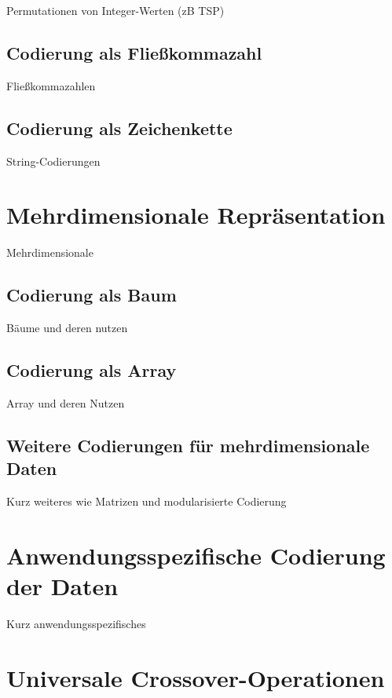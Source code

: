 \documentclass{llncs}
\begin{document}
Permutationen von Integer-Werten (zB TSP)

\subsection{Codierung als Fließkommazahl}
\label{sec:FloatCod}

Fließkommazahlen

\subsection{Codierung als Zeichenkette}
\label{sec:StrCod}

String-Codierungen

\section{Mehrdimensionale Repräsentation}
\label{sec:MehrdimRep}

Mehrdimensionale

\subsection{Codierung als Baum}
\label{sec:BaumCod}

Bäume und deren nutzen

\subsection{Codierung als Array}
\label{sec:ArrayCod}

Array und deren Nutzen

\subsection{Weitere Codierungen für mehrdimensionale Daten}
\label{sec:WeitereMehrdimensionale}

Kurz weiteres wie Matrizen und modularisierte Codierung

\section{Anwendungsspezifische Codierung der Daten}
\label{sec:AnwendungsspezifischeCod}

Kurz anwendungsspezifisches

\section{Universale Crossover-Operationen}
\label{sec:UniversaleOp}
\end{document}
